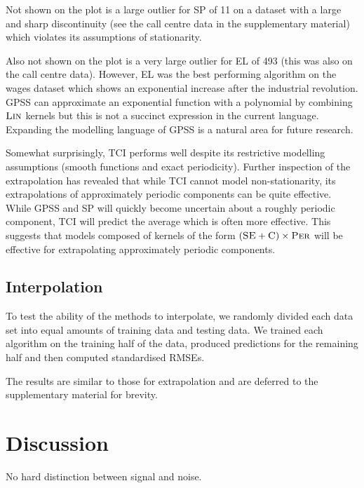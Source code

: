 \documentclass{article}
\begin{document}
Not shown on the plot is a large outlier for SP of 11 on a dataset with a large and sharp discontinuity (see the call centre data in the supplementary material) which violates its assumptions of stationarity.

Also not shown on the plot is a very large outlier for EL of 493 (this was also on the call centre data).
However, EL was the best performing algorithm on the wages dataset which shows an exponential increase after the industrial revolution.
GPSS can approximate an exponential function with a polynomial by combining ${\textsc{Lin}}$ kernels but this is not a succinct expression in the current language.
Expanding the modelling language of GPSS is a natural area for future research.

Somewhat surprisingly, TCI performs well despite its restrictive modelling assumptions (smooth functions and exact periodicity).
Further inspection of the extrapolation has revealed that while TCI cannot model non-stationarity, its extrapolations of approximately periodic components can be quite effective.
While GPSS and SP will quickly become uncertain about a roughly periodic component, TCI will predict the average which is often more effective.
This suggests that models composed of kernels of the form $({\textsc{SE}} + {\textsc{C}}) \times {\textsc{Per}}$ will be effective for extrapolating approximately periodic components.

\subsection{Interpolation}

To test the ability of the methods to interpolate, we randomly divided each data set into equal amounts of training data and testing data.
We trained each algorithm on the training half of the data, produced predictions for the remaining half and then computed standardised RMSEs.

The results are similar to those for extrapolation and are deferred to the supplementary material for brevity.

\section{Discussion}



No hard distinction between signal and noise.
\end{document}
